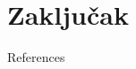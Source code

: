 \documentclass{beamer}
\begin{document}







\section{Zaključak}


\begin{frame}{References}
    \nocite{*} %
	
	
\end{frame}
\end{document}
